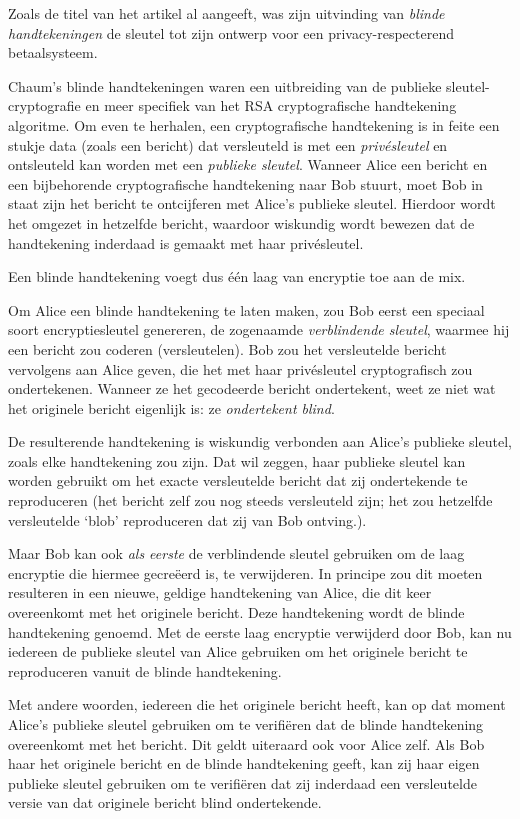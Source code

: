 \documentclass[
  a5paper,
  smalldemyvopaper,11pt,twoside,onecolumn,openright,extrafontsizes]{memoir}
\begin{document}
Zoals de titel van het artikel al aangeeft, was zijn uitvinding van
\emph{blinde handtekeningen} de sleutel tot zijn ontwerp voor een
privacy-respecterend betaalsysteem.

Chaum's blinde handtekeningen waren een uitbreiding van de publieke
sleutel-cryptografie en meer specifiek van het RSA cryptografische
handtekening algoritme. Om even te herhalen, een cryptografische
handtekening is in feite een stukje data (zoals een bericht) dat
versleuteld is met een \emph{privésleutel} en ontsleuteld kan worden met
een \emph{publieke sleutel}. Wanneer Alice een bericht en een
bijbehorende cryptografische handtekening naar Bob stuurt, moet Bob in
staat zijn het bericht te ontcijferen met Alice's publieke sleutel.
Hierdoor wordt het omgezet in hetzelfde bericht, waardoor wiskundig
wordt bewezen dat de handtekening inderdaad is gemaakt met haar
privésleutel.

Een blinde handtekening voegt dus één laag van encryptie toe aan de mix.

Om Alice een blinde handtekening te laten maken, zou Bob eerst een
speciaal soort encryptiesleutel genereren, de zogenaamde
\emph{verblindende sleutel}, waarmee hij een bericht zou coderen
(versleutelen). Bob zou het versleutelde bericht vervolgens aan Alice
geven, die het met haar privésleutel cryptografisch zou ondertekenen.
Wanneer ze het gecodeerde bericht ondertekent, weet ze niet wat het
originele bericht eigenlijk is: ze \emph{ondertekent blind}.

De resulterende handtekening is wiskundig verbonden aan Alice's publieke
sleutel, zoals elke handtekening zou zijn. Dat wil zeggen, haar publieke
sleutel kan worden gebruikt om het exacte versleutelde bericht dat zij
ondertekende te reproduceren (het bericht zelf zou nog steeds
versleuteld zijn; het zou hetzelfde versleutelde `blob' reproduceren dat
zij van Bob ontving.).

Maar Bob kan ook \emph{als eerste} de verblindende sleutel gebruiken om
de laag encryptie die hiermee gecreëerd is, te verwijderen. In principe
zou dit moeten resulteren in een nieuwe, geldige handtekening van Alice,
die dit keer overeenkomt met het originele bericht. Deze handtekening
wordt de blinde handtekening genoemd. Met de eerste laag encryptie
verwijderd door Bob, kan nu iedereen de publieke sleutel van Alice
gebruiken om het originele bericht te reproduceren vanuit de blinde
handtekening.

Met andere woorden, iedereen die het originele bericht heeft, kan op dat
moment Alice's publieke sleutel gebruiken om te verifiëren dat de blinde
handtekening overeenkomt met het bericht. Dit geldt uiteraard ook voor
Alice zelf. Als Bob haar het originele bericht en de blinde handtekening
geeft, kan zij haar eigen publieke sleutel gebruiken om te verifiëren
dat zij inderdaad een versleutelde versie van dat originele bericht
blind ondertekende.
\end{document}
